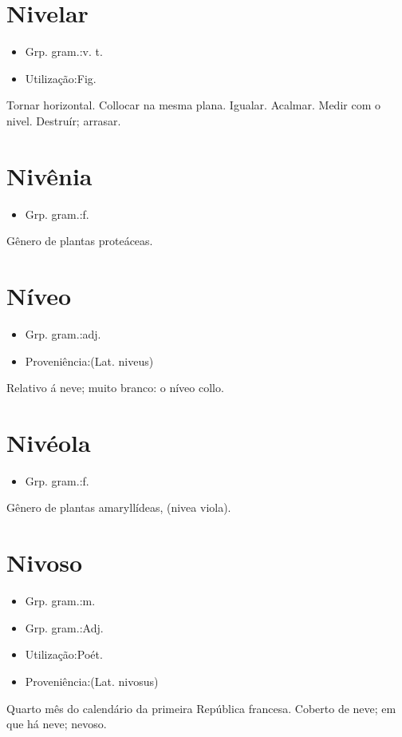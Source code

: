 \section{Nivelar}
\begin{itemize}
\item {Grp. gram.:v. t.}
\end{itemize}
\begin{itemize}
\item {Utilização:Fig.}
\end{itemize}
Tornar horizontal.
Collocar na mesma plana.
Igualar.
Acalmar.
Medir com o nivel.
Destruír; arrasar.
\section{Nivênia}
\begin{itemize}
\item {Grp. gram.:f.}
\end{itemize}
Gênero de plantas proteáceas.
\section{Níveo}
\begin{itemize}
\item {Grp. gram.:adj.}
\end{itemize}
\begin{itemize}
\item {Proveniência:(Lat. \textunderscore niveus\textunderscore )}
\end{itemize}
Relativo á neve; muito branco: \textunderscore o níveo collo\textunderscore .
\section{Nivéola}
\begin{itemize}
\item {Grp. gram.:f.}
\end{itemize}
Gênero de plantas amaryllídeas, (\textunderscore nivea viola\textunderscore ).
\section{Nivoso}
\begin{itemize}
\item {Grp. gram.:m.}
\end{itemize}
\begin{itemize}
\item {Grp. gram.:Adj.}
\end{itemize}
\begin{itemize}
\item {Utilização:Poét.}
\end{itemize}
\begin{itemize}
\item {Proveniência:(Lat. \textunderscore nivosus\textunderscore )}
\end{itemize}
Quarto mês do calendário da primeira República francesa.
Coberto de neve; em que há neve; nevoso.
